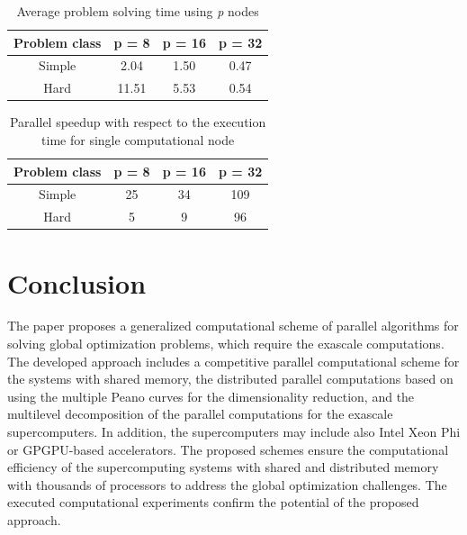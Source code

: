 \documentclass[
11pt,%
tightenlines,%
twoside,%
onecolumn,%
nofloats,%
nobibnotes,%
nofootinbib,%
superscriptaddress,%
noshowpacs,%
centertags]%
{revtex4}
\begin{document}
\begin{table}
	\caption{Average problem solving time using \textit{p} nodes}
	\label{tab:tab1}
	\center
	\begin{tabular}{|c|c|c|c|}
	\hline 
		Problem class & \parbox[c]{1.6cm}{ \centering p = 8 } & 
		\parbox[c]{1.6cm}{ \centering p = 16 } &
		\parbox[c]{1.6cm}{ \centering p = 32 } \\
	\hline 
		Simple &  2.04 & 1.50 & 0.47 \\
	\hline 
		Hard   & 11.51 & 5.53 & 0.54 \\
	\hline 
	\end{tabular}
\end{table}

\begin{table}
	\caption{Parallel speedup with respect to the execution time for single computational node}
	\label{tab:tab2}
	\center
	\begin{tabular}{|c|c|c|c|}
	\hline 
		Problem class & \parbox[c]{1.6cm}{ \centering p = 8 } & 
		\parbox[c]{1.6cm}{ \centering p = 16 } &
		\parbox[c]{1.6cm}{ \centering p = 32 } \\
	\hline 
		Simple & 25 & 34 & 109 \\
	\hline 
		Hard   & 5  & 9  & 96  \\
	\hline 
	\end{tabular}
\end{table}


\section{Conclusion}

The paper proposes a generalized computational scheme of parallel algorithms for solving global optimization problems, which require the exascale computations. The developed approach includes a competitive parallel computational scheme for the systems with shared memory, the distributed parallel computations based on using the multiple Peano curves for the dimensionality reduction, and the multilevel decomposition of the parallel computations for the exascale supercomputers. In addition, the supercomputers may include also Intel Xeon Phi or GPGPU-based accelerators. The proposed schemes ensure the computational efficiency of the supercomputing systems with shared and distributed memory with thousands of processors to address the global optimization challenges. The executed computational experiments confirm the potential of the proposed approach.
\end{document}
